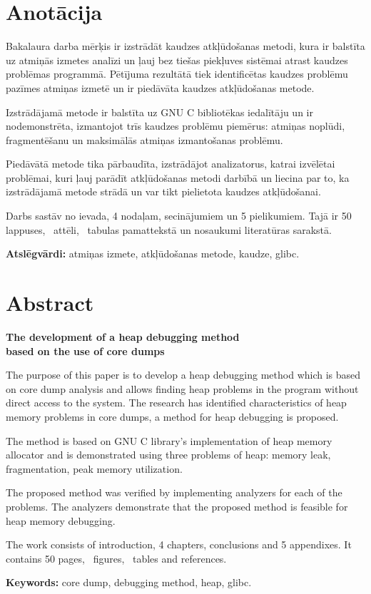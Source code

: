 \chapter*{Anotācija}
\thispagestyle{empty}

Bakalaura darba mērķis ir izstrādāt kaudzes atkļūdošanas metodi, kura ir balstīta uz atmiņās izmetes analīzi un ļauj bez tiešas piekļuves sistēmai atrast kaudzes problēmas programmā.
Pētījuma rezultātā tiek identificētas kaudzes problēmu pazīmes atmiņas izmetē un ir piedāvāta kaudzes atkļūdošanas metode.

Izstrādājamā metode ir balstīta uz GNU C bibliotēkas iedalītāju un ir nodemonstrēta, izmantojot trīs kaudzes problēmu piemērus: atmiņas noplūdi, fragmentēšanu un maksimālās atmiņas izmantošanas problēmu.


Piedāvātā metode tika pārbaudīta, izstrādājot analizatorus, katrai izvēlētai problēmai, kuri ļauj parādīt atkļūdošanas metodi darbībā un liecina par to, ka izstrādājamā metode strādā un var tikt pielietota kaudzes atkļūdošanai.

Darbs sastāv no ievada, 4 nodaļam, secinājumiem un 5 pielikumiem. Tajā ir 50 lappuses, \totfig\ attēli, \tottab\ tabulas pamattekstā un  nosaukumi literatūras sarakstā.

\textbf{Atslēgvārdi:} atmiņas izmete, atkļūdošanas metode, kaudze, glibc.

\newpage

\chapter*{Abstract}
\begin{center}
\linespread{1.2}
\vspace{-0.3cm}
\large \textbf {The development of a heap debugging method \protect\\  based on the use of core dumps}
\end{center}

The purpose of this paper is to develop a heap debugging method which is based on core dump analysis and allows finding heap problems in the program without direct access to the system.
The research has identified characteristics of heap memory problems in core dumps, a method for heap debugging is proposed.

The method is based on GNU C library's implementation of heap memory allocator and is demonstrated using three problems of heap: memory leak, fragmentation, peak memory utilization.

The proposed method was verified by implementing analyzers for each of the problems.
The analyzers demonstrate that the proposed method is feasible for heap memory debugging.


\thispagestyle{empty}
	The work consists of introduction, 4 chapters, conclusions and 5 appendixes. It contains 50 pages, \totfig\ figures, \tottab\ tables and  references.

\textbf{Keywords:} core dump, debugging method, heap, glibc.


\newpage 






